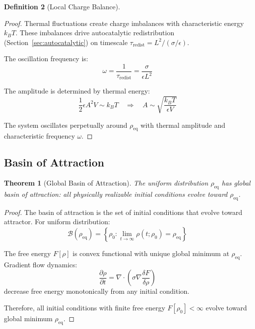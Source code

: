 \documentclass[12pt,a4paper]{article}
\theoremstyle{plain}
\newtheorem{theorem}{Theorem}[section]
\theoremstyle{definition}
\newtheorem{definition}[theorem]{Definition}
\theoremstyle{remark}
\begin{document}
\begin{definition}[Local Charge Balance]
\begin{proof}
Thermal fluctuations create charge imbalances with characteristic energy $k_B T$. These imbalances drive autocatalytic redistribution (Section~\ref{sec:autocatalytic}) on timescale $\tau_{\text{redist}} = L^2 / (\sigma/\epsilon)$.

The oscillation frequency is:
\begin{equation}
\omega = \frac{1}{\tau_{\text{redist}}} = \frac{\sigma}{\epsilon L^2}
\end{equation}

The amplitude is determined by thermal energy:
\begin{equation}
\frac{1}{2} \epsilon A^2 V \sim k_B T \quad \Rightarrow \quad A \sim \sqrt{\frac{k_B T}{\epsilon V}}
\end{equation}

The system oscillates perpetually around $\rho_{\text{eq}}$ with thermal amplitude and characteristic frequency $\omega$.
\end{proof}

\subsection{Basin of Attraction}

\begin{theorem}[Global Basin of Attraction]
\label{thm:global_basin}
The uniform distribution $\rho_{\text{eq}}$ has global basin of attraction: all physically realizable initial conditions evolve toward $\rho_{\text{eq}}$.
\end{theorem}

\begin{proof}
The basin of attraction is the set of initial conditions that evolve toward attractor. For uniform distribution:
\begin{equation}
\mathcal{B}(\rho_{\text{eq}}) = \left\{ \rho_0 : \lim_{t \to \infty} \rho(t; \rho_0) = \rho_{\text{eq}} \right\}
\end{equation}

The free energy $F[\rho]$ is convex functional with unique global minimum at $\rho_{\text{eq}}$. Gradient flow dynamics:
\begin{equation}
\frac{\partial \rho}{\partial t} = \nabla \cdot \left( \sigma \nabla \frac{\delta F}{\delta \rho} \right)
\end{equation}
decrease free energy monotonically from any initial condition.

Therefore, all initial conditions with finite free energy $F[\rho_0] < \infty$ evolve toward global minimum $\rho_{\text{eq}}$.


\end{proof}
\end{definition}
\end{document}
